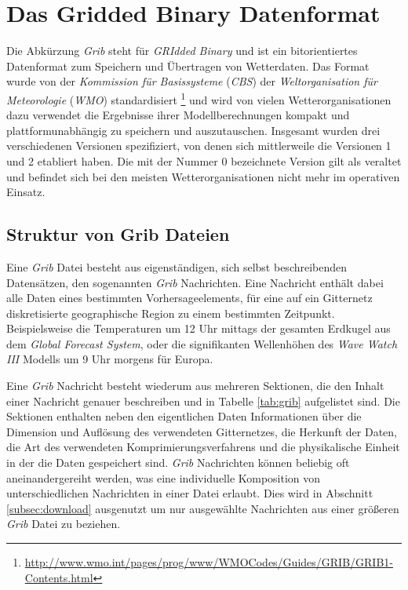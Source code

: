 \section{Das Gridded Binary Datenformat}
Die Abkürzung \textit{Grib}  steht
für \textit{GRIdded Binary} und ist ein bitorientiertes Datenformat
zum Speichern und Übertragen von Wetterdaten. Das Format wurde von der
\textit{Kommission für Basissysteme} (\textit{CBS})
 der
\textit{Weltorganisation für Meteorologie} (\textit{WMO})
 standardisiert
\footnote{\url{http://www.wmo.int/pages/prog/www/WMOCodes/Guides/GRIB/GRIB1-Contents.html}}
und wird von vielen Wetterorganisationen dazu verwendet die Ergebnisse
ihrer Modellberechnungen kompakt und plattformunabhängig zu speichern
und auszutauschen. Insgesamt wurden drei verschiedenen Versionen
spezifiziert, von denen sich mittlerweile die Versionen 1 und 2
etabliert haben. Die mit der Nummer 0 bezeichnete Version gilt als
veraltet und befindet sich bei den meisten Wetterorganisationen nicht
mehr im operativen Einsatz.

\subsection{Struktur von Grib Dateien}
Eine \textit{Grib} Datei besteht aus eigenständigen, sich selbst
beschreibenden Datensätzen, den sogenannten \textit{Grib}
Nachrichten. Eine Nachricht enthält dabei alle Daten eines bestimmten
Vorhersageelements, für eine auf ein Gitternetz diskretisierte
geographische Region zu einem bestimmten Zeitpunkt. Beispielsweise die
Temperaturen um 12 Uhr mittags der gesamten Erdkugel aus dem
\textit{Global Forecast System}, oder die signifikanten Wellenhöhen
des \textit{Wave Watch III} Modells um 9 Uhr morgens für Europa.

Eine \textit{Grib} Nachricht besteht wiederum aus mehreren Sektionen,
die den Inhalt einer Nachricht genauer beschreiben und in Tabelle
\ref{tab:grib} aufgelistet sind. Die Sektionen enthalten neben den
eigentlichen Daten Informationen über die Dimension und Auflösung des
verwendeten Gitternetzes, die Herkunft der Daten, die Art des
verwendeten Komprimierungsverfahrens und die physikalische Einheit in
der die Daten gespeichert sind. \textit{Grib} Nachrichten können
beliebig oft aneinandergereiht werden, was eine individuelle
Komposition von unterschiedlichen Nachrichten in einer Datei
erlaubt. Dies wird in Abschnitt \ref{subsec:download} ausgenutzt um
nur ausgewählte Nachrichten aus einer größeren \textit{Grib} Datei zu
beziehen.

